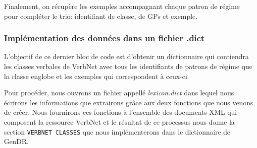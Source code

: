Finalement, on récupère les exemples accompagnant chaque patron de régime pour compléter le trio: identifiant de classe, de \acp{GP} et exemple. 

\subsubsection{Implémentation des données dans un fichier .dict}

L'objectif de ce dernier bloc de code est d'obtenir un dictionnaire qui contiendra les classes verbales de VerbNet avec tous les identifiants de patrons de régime que la classe englobe et les exemples qui correspondent à ceux-ci.

Pour procéder, nous ouvrons un fichier appellé \emph{lexicon.dict} dans lequel nous écrirons les informations que extrairons grâce aux deux fonctions que nous venons de créer. Nous fournirons ces fonctions à l'ensemble des documents XML qui composent la ressource VerbNet et le résultat de ce processus nous donne la section \texttt{VERBNET CLASSES} que nous implémenterons dans le dictionnaire de GenDR.


